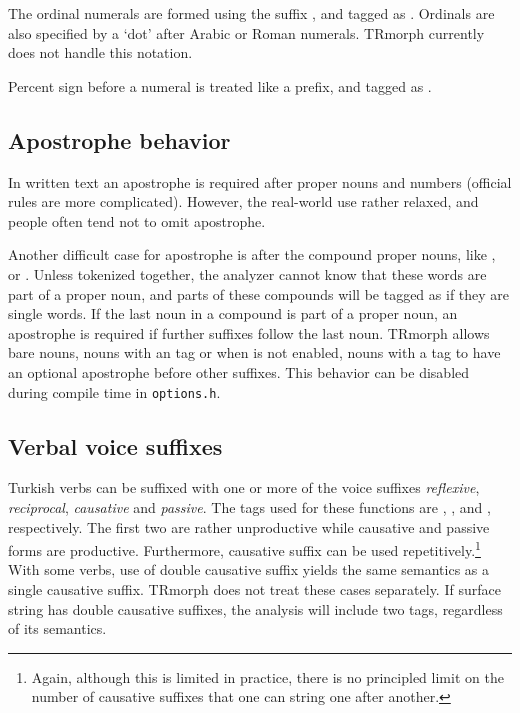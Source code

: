 \documentclass[twocolumn]{article}
\begin{document}
The ordinal numerals are formed using the suffix , and
tagged as . Ordinals are also specified by a `dot'
after Arabic or Roman numerals. TRmorph currently does not handle this
notation.

Percent sign before a numeral is treated like a prefix, and tagged as
.

\subsection{Apostrophe behavior}

In written text an apostrophe is required after proper nouns and numbers
(official rules are more complicated).
However, the real-world use rather relaxed, and people often tend not to omit apostrophe.

Another difficult case for apostrophe is after the compound proper nouns, 
like 
,  or 
.
Unless tokenized together, 
the analyzer cannot know that these words are part of a proper noun,
and parts of these compounds will be tagged as if they are single words. 
If the last noun in a compound is part of a proper noun, 
an apostrophe is required if further suffixes follow the last noun. 
TRmorph allows bare nouns, 
nouns with an  tag or 
when  is not enabled, nouns with a  tag
to have an optional apostrophe before other suffixes.
This behavior can be disabled during compile time in \lstinline{options.h}.

\subsection{Verbal voice suffixes}

Turkish verbs can be suffixed with one or more of the voice suffixes
\emph{reflexive}, \emph{reciprocal}, \emph{causative} and
\emph{passive}. The tags used for these functions are 
,
,
 and
, respectively. The first two are rather unproductive
while causative and passive forms are productive. Furthermore,
causative suffix can be used repetitively.\footnote{Again, although this is
limited in practice, there is no principled limit on the number of causative
suffixes that one can string one after another.} With some verbs, use of double
causative suffix yields the same semantics as a single causative suffix. TRmorph does
not treat these cases separately. If surface string has double
causative suffixes, the analysis will include two  tags,
regardless of its semantics.
\end{document}
